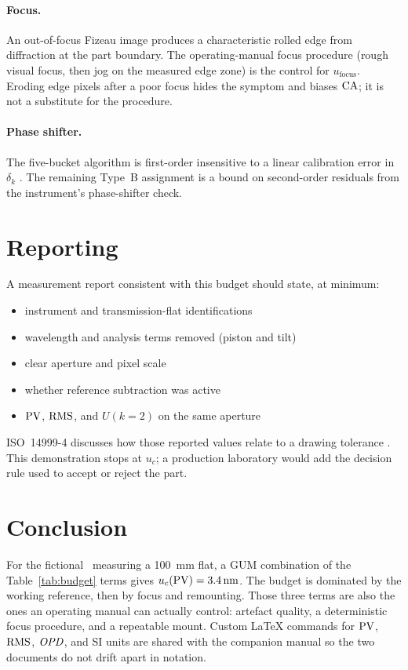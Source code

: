 \paragraph{Focus.}
An out-of-focus Fizeau image produces a characteristic rolled edge from diffraction at the part boundary. The operating-manual focus procedure (rough visual focus, then jog on the measured edge zone) is the control for \(u_{\mathrm{focus}}\). Eroding edge pixels after a poor focus hides the symptom and biases \(\mathrm{CA}\); it is not a substitute for the procedure.

\paragraph{Phase shifter.}
The five-bucket algorithm is first-order insensitive to a linear calibration error in \(\delta_k\) \cite{hariharan1987,creath1988}. The remaining Type~B assignment is a bound on second-order residuals from the instrument's phase-shifter check.

\section{Reporting}

A measurement report consistent with this budget should state, at minimum:

\begin{itemize}
  \item instrument and transmission-flat identifications
  \item wavelength and analysis terms removed (piston and tilt)
  \item clear aperture and pixel scale
  \item whether reference subtraction was active
  \item \(\mathrm{PV}\), \(\mathrm{RMS}\), and \(U(k=2)\) on the same aperture
\end{itemize}

ISO~14999-4 discusses how those reported values relate to a drawing tolerance \cite{iso14999-4}. This demonstration stops at \(u_c\); a production laboratory would add the decision rule used to accept or reject the part.

\section{Conclusion}

For the fictional \instrument\ measuring a \SI{100}{\milli\meter} flat, a GUM combination of the Table~\ref{tab:budget} terms gives \(u_c(\mathrm{PV})=\SI{3.4}{\nano\meter}\). The budget is dominated by the working reference, then by focus and remounting. Those three terms are also the ones an operating manual can actually control: artefact quality, a deterministic focus procedure, and a repeatable mount. Custom LaTeX commands for \(\mathrm{PV}\), \(\mathrm{RMS}\), \(\mathit{OPD}\), and SI units are shared with the companion manual so the two documents do not drift apart in notation.

\printbibliography


